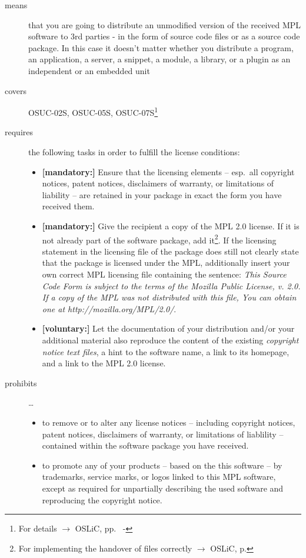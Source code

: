 \begin{description}

\item[means] that you are going to distribute an unmodified version of the
received MPL software to 3rd parties - in the form of source code files or as a
source code package. In this case it doesn't matter whether you distribute a
program, an application, a server, a snippet, a module, a library, or a plugin
as an independent or an embedded unit

\item[covers] OSUC-02S, OSUC-05S, OSUC-07S\footnote{For details $\rightarrow$
OSLiC, pp.\ \pageref{OSUC-02S-DEF} - \pageref{OSUC-07S-DEF}}

\item[requires] the following tasks in order to fulfill the license conditions:
\begin{itemize}
  
  \item \textbf{[mandatory:]} Ensure that the licensing elements -- esp.\ all
  copyright notices, patent notices, disclaimers of warranty, or limitations of
  liability -- are retained in your package in exact the form you have received
  them.

  \item \textbf{[mandatory:]} Give the recipient a copy of the MPL 2.0 license.
  If it is not already part of the software package, add it\footnote{For
  implementing the handover of files correctly $\rightarrow$ OSLiC, p.
  \pageref{DistributingFilesHint}}. If the licensing statement in the licensing
  file of the package does still not clearly state that the package is licensed
  under the MPL, additionally insert your own correct MPL licensing file
  containing the sentence: \emph{This Source Code Form is subject to the terms
  of the Mozilla Public License, v. 2.0. If a copy of the MPL was not
  distributed with this file, You can obtain one at
  http://mozilla.org/MPL/2.0/}.

  \item \textbf{[voluntary:]} Let the documentation of your distribution and/or
  your additional material also reproduce the content of the existing
  \emph{copyright notice text files}, a hint to the software name, a link to its
  homepage, and a link to the MPL 2.0 license.
\end{itemize}

\item[prohibits] \ldots
\begin{itemize}
  \item to remove or to alter any license notices -- including copyright
  notices, patent notices, disclaimers of warranty, or limitations of liablility
  -- contained within the software package you have received.
  \item to promote any of your products -- based on the this software -- by
  trademarks, service marks, or logos linked to this MPL software, except as
  required for unpartially describing the used software and reproducing the
  copyright notice.
\end{itemize}
\end{description}


